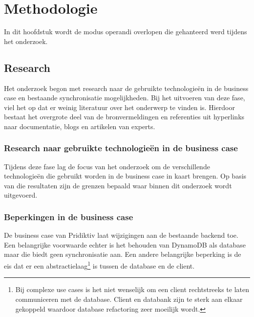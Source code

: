
\chapter{Methodologie}
\label{ch:methodologie}
In dit hoofdstuk wordt de modus operandi overlopen die gehanteerd werd tijdens het onderzoek.
\section{Research}
Het onderzoek begon met research naar de gebruikte technologie\"en in de business case en bestaande synchronisatie mogelijkheden. Bij het uitvoeren van deze fase, viel het op dat er weinig literatuur over het onderwerp te vinden is. Hierdoor bestaat het overgrote deel van de bronvermeldingen en referenties uit hyperlinks naar documentatie, blogs en artikelen van experts. 
\subsection{Research naar gebruikte technologie\"en in de business case}
Tijdens deze fase lag de focus van het onderzoek om de verschillende technologie\"en die gebruikt worden in de business case in kaart brengen. Op basis van die resultaten zijn de grenzen bepaald waar binnen dit onderzoek wordt uitgevoerd.
\subsection{Beperkingen in de business case}
\label{subsec:beperkingen-business-case}
De business case van Pridiktiv laat wijzigingen aan de bestaande backend toe. Een belangrijke voorwaarde echter is het behouden van DynamoDB als database maar die biedt geen synchronisatie aan. Een andere belangrijke beperking is de eis dat er een abstractielaag\footnote{Bij complexe use cases is het niet wenselijk om een client rechtstreeks te laten communiceren met de database. Client en databank zijn te sterk aan elkaar gekoppeld waardoor database refactoring zeer moeilijk wordt.} is tussen de database en de client.
